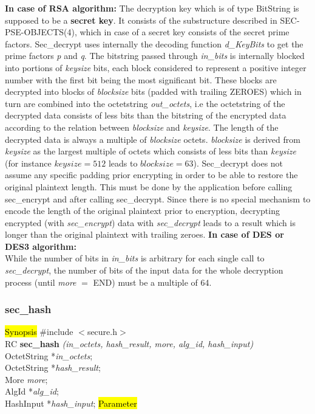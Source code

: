 {\bf In case of RSA algorithm:}
\be
\m The decryption key which is of type BitString is supposed to be
   a {\bf secret key}. It consists of the substructure described in
   SEC-PSE-OBJECTS(4), which in case of a secret key consists of the secret
   prime factors. Sec\_decrypt uses internally the
   decoding function {\em d\_KeyBits} to get the prime factors {\em p} and {\em q}.
\m The bitstring passed through {\em in\_bits} is internally blocked into portions of
   {\em keysize} bits, each block considered to represent a positive integer number with the first bit
   being the most significant bit. These blocks are decrypted into blocks of {\em blocksize} bits
   (padded with trailing ZEROES) which in turn are combined into the octetstring {\em out\_octets}, i.e
   the octetstring of the decrypted data consists of less bits than the bitstring 
   of the encrypted data
   according to the relation between {\em blocksize} and {\em keysize}.
   The length of the decrypted data is always a multiple of {\em blocksize} octets.
   {\em blocksize} is derived from {\em keysize} as the largest multiple of octets which consists of
   less bits than {\em keysize} (for instance $keysize = 512$ leads to $blocksize = 63$).
\m Sec\_decrypt does not assume any specific padding prior encrypting in order to be able to
   restore the original plaintext length. This must be done by the application before 
   calling  sec\_encrypt and after calling sec\_decrypt.
\m Since there is no special mechanism to encode the length of the original plaintext prior
   to encryption, decrypting encrypted (with {\em sec\_encrypt}) data with {\em sec\_decrypt}
   leads to a result which is longer than the original plaintext with trailing zeroes.
\ee
{\bf In case of DES or DES3 algorithm:} \\ [1em]
   While the number of bits in {\em in\_bits} is arbitrary for each single call to
   {\em sec\_decrypt}, the number of bits of the input data for the whole
   decryption process (until {\em more} $=$ END) must be a multiple of 64. 


\subsubsection{sec\_hash}
\label{sec_hash}
\hl{Synopsis}
\#include $<$secure.h$>$ \\ [0.5cm]
RC {\bf sec\_hash} {\em (in\_octets, hash\_result, more, alg\_id, hash\_input)} \\
OctetString *{\em in\_octets}; \\
OctetString *{\em hash\_result}; \\
More {\em more}; \\
AlgId *{\em alg\_id}; \\
HashInput *{\em hash\_input};
\hl{Parameter}


